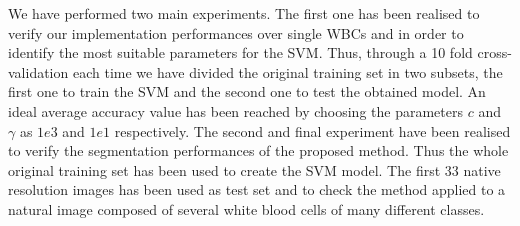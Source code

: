\documentclass[final,a4paper,12pt,english]{UnicaPhdThesis3}
\begin{document}
	We have performed two main experiments. The first one has been realised to verify our implementation performances over single WBCs and in order to identify the most suitable parameters for the SVM. Thus, through a 10 fold cross-validation each time we have divided the original training set in two subsets, the first one to train the SVM and the second one to test the obtained model. An ideal average accuracy value has been reached by choosing the parameters $c$ and $\gamma$ as $1e3$ and $1e1$ respectively. 
	The second and final experiment have been realised to verify the segmentation performances of the proposed method. Thus the whole original training set has been used to create the SVM model. The first 33 native resolution images has been used as test set and to check the method applied to a natural image composed of several white blood cells of many different classes. 
	
\end{document}
